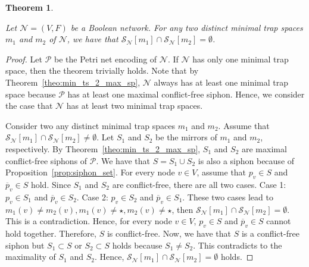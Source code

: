 \documentclass[preprint,12pt]{elsarticle}
\newtheorem{theorem}{Theorem}[section]
\begin{document}
\begin{theorem}%
\label{theo:separation_min_ts}

  Let \(\mathcal{N} = (V, F)\) be a Boolean network.
  For any two distinct minimal trap spaces \(m_1\) and \(m_2\) of \(\mathcal{N}\), we have that \(\mathcal{S}_{\mathcal{N}}[m_1] \cap \mathcal{S}_{\mathcal{N}}[m_2] = \emptyset\).

\end{theorem}

\begin{proof}

  Let \(\mathcal{P}\) be the Petri net encoding of \(\mathcal{N}\).
  If \(\mathcal{N}\) has only one minimal trap space, then the theorem trivially holds.
  Note that by Theorem~\ref{theo:min_ts_2_max_sp}, \(\mathcal{N}\) always has at least one minimal trap space because \(\mathcal{P}\) has at least one maximal conflict-free siphon.
  Hence, we consider the case that \(\mathcal{N}\) has at least two minimal trap spaces.

  Consider two any distinct minimal trap spaces \(m_1\) and \(m_2\).
  Assume that \(\mathcal{S}_{\mathcal{N}}[m_1] \cap \mathcal{S}_{\mathcal{N}}[m_2] \neq \emptyset\).
  Let \(S_1\) and \(S_2\) be the mirrors of \(m_1\) and \(m_2\), respectively.
  By Theorem~\ref{theo:min_ts_2_max_sp}, \(S_1\) and \(S_2\) are maximal conflict-free siphons of \(\mathcal{P}\).
  We have that \(S = S_1 \cup S_2\) is also a siphon because of Proposition~\ref{prop:siphon_set}.
  For every node \(v \in V\), assume that \(p_v \in S\) and \(\overline{p}_v \in S\) hold.
  Since \(S_1\) and \(S_2\) are conflict-free, there are all two cases.
  Case 1: \(p_v \in S_1\) and \(\overline{p}_v \in S_2\).
  Case 2: \(p_v \in S_2\) and \(\overline{p}_v \in S_1\).
  These two cases lead to \(m_1(v) \neq m_2(v), m_1(v) \neq \star, m_2(v) \neq \star\), then  \(\mathcal{S}_{\mathcal{N}}[m_1] \cap \mathcal{S}_{\mathcal{N}}[m_2] = \emptyset\).
  This is a contradiction.
  Hence, for every node \(v \in V\), \(p_v \in S\) and \(\overline{p}_v \in S\) cannot hold together.
  Therefore, \(S\) is conflict-free.
  Now, we have that \(S\) is a conflict-free siphon but \(S_1 \subset S\) or \(S_2 \subset S\) holds because \(S_1 \neq S_2\).
  This contradicts to the maximality of \(S_1\) and \(S_2\).
  Hence, \(\mathcal{S}_{\mathcal{N}}[m_1] \cap \mathcal{S}_{\mathcal{N}}[m_2] = \emptyset\) holds.

\end{proof}
\end{document}
